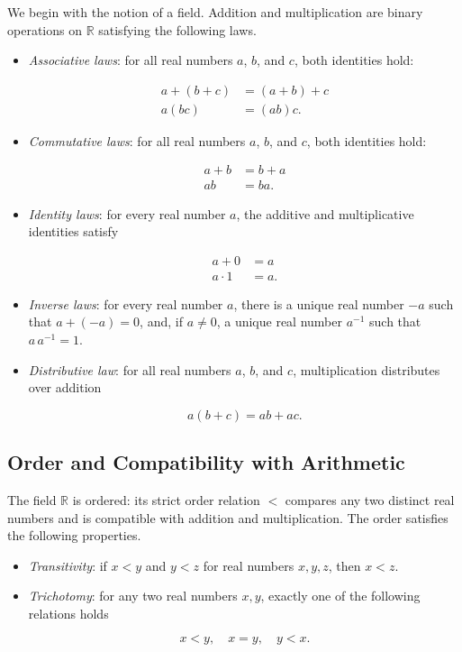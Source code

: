 We begin with the notion of a field. Addition and multiplication are binary operations on $\mathbb{R}$ satisfying the following laws.
\begin{itemize}
\item \textit{Associative laws}: for all real numbers $a$, $b$, and $c$, both identities hold:

\[
\begin{aligned}
a + (b+c) &= (a+b) + c \\
a(bc) &= (ab)c.
\end{aligned}
\]

\item \textit{Commutative laws}: for all real numbers $a$, $b$, and $c$, both identities hold:

\[
\begin{aligned}
a + b &= b + a \\
ab &= ba.
\end{aligned}
\]

\item \textit{Identity laws}: for every real number $a$, the additive and multiplicative identities satisfy

\[
\begin{aligned}
a + 0 &= a \\
a \cdot 1 &= a.
\end{aligned}
\]

\item \textit{Inverse laws}: for every real number $a$, there is a unique real number $-a$ such that $a + (-a) = 0$, and, if $a \neq 0$, a unique real number $a^{-1}$ such that $a \, a^{-1} = 1$.

\item \textit{Distributive law}: for all real numbers $a$, $b$, and $c$, multiplication distributes over addition

\[
a(b+c) = ab + ac.
\]

\end{itemize}

\subsection{Order and Compatibility with Arithmetic}

The field $\mathbb{R}$ is ordered: its strict order relation $<$ compares any two distinct real numbers and is compatible with addition and multiplication.
The order satisfies the following properties.
\begin{itemize}
\item \textit{Transitivity}: if $x < y$ and $y < z$ for real numbers $x, y, z$, then $x < z$.
\item \textit{Trichotomy}: for any two real numbers $x, y$, exactly one of the following relations holds

\[
x < y, \quad x = y, \quad y < x.
\]

\end{itemize}

